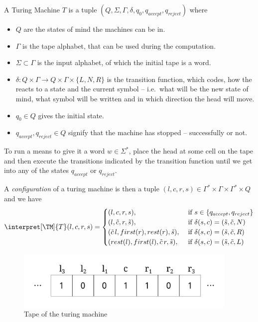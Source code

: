 \begin{defn}
	\label{def:tm}
	A Turing Machine $T$ is a tuple $(Q, \Sigma, \Gamma, \delta, q_0, q_{accept}, q_{reject})$
	where 
	\begin{itemize}
		\item $Q$ are the states of mind the machines can be in.
		\item $\Gamma$ is the tape alphabet, that can be used during the computation.
		\item $\Sigma\subset \Gamma$ is the input alphabet, of which the initial tape is a word.
		\item $\delta:Q\times \Gamma \rightarrow Q\times \Gamma\times \{L, N, R\}$ 
			is the transition function, which codes, how the \TM reacts to a state 
			and the current symbol -- i.e.\ what will be the new state of mind, what 
			symbol will be written and in which direction the head will move.
		\item $q_0\in Q$ gives the initial state.
		\item $q_{accept}, q_{reject}\in Q$ signify that the machine has stopped --
			successfully or not.
	\end{itemize}

	To run a \TM means to give it a word $w\in\Sigma^*$, place the head at some 
	cell on the tape and then execute the transitions indicated by the transition
	function until we get into any of the states $q_{accept}$ or $q_{reject}$.

	A \emph{configuration} of a turing machine is then a tuple 
	$(l, c, r, s) \in \Gamma^*\times \Gamma \times \Gamma^*\times Q$ 
	and we have 
	\begin{equation*}
		\interpret[\TM]{T}(l, c, r, s) = \begin{cases}
			(l, c, r, s), &\text{ if } s \in \{q_{accept}, q_{reject}\} \\
			(l, \tilde{c}, r, \tilde{s}) , &\text{ if } \delta(s,c) = (\tilde{s}, \tilde{c}, N)\\
			(\tilde{c}\, l , first(r), rest(r), \tilde{s}) , &\text{ if } \delta(s,c) = (\tilde{s}, \tilde{c}, R)\\
			(rest(l), first(l), \tilde{c}\, r, \tilde{s}) , &\text{ if } \delta(s,c) = (\tilde{s}, \tilde{c}, L)
		\end{cases}
	\end{equation*}

	\begin{figure}[htb]
		\includegraphics[width=0.95\textwidth]{computability/completeness/pictures/turingtape}
		\caption{Tape of the turing machine}
	\end{figure}
\end{defn}

